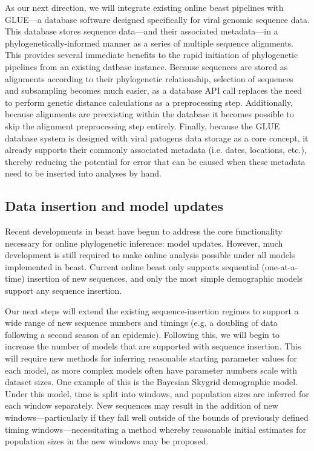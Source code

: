 As our next direction, we will integrate existing online \gls{beast} pipelines with GLUE\cite{singer2018glue}---a database software designed specifically for viral genomic sequence data.
This database stores sequence data---and their associated metadata---in a phylogenetically-informed manner as a series of multiple sequence alignments.
This provides several immediate benefits to the rapid initiation of phylogenetic pipelines from an existing datbase instance.
Because sequences are stored as alignments according to their phylogenetic relationship, selection of sequences and subsampling becomes much easier, as a database API call replaces the need to perform genetic distance calculations as a preprocessing step.
Additionally, because alignments are preexisting within the database it becomes possible to skip the alignment preprocessing step entirely.
Finally, because the GLUE database system is designed with viral patogens data storage as a core concept, it already supports their commonly associated metadata (i.e. dates, locations, etc.), thereby reducing the potential for error that can be caused when these metadata need to be inserted into analyses by hand.

\subsection{Data insertion and model updates}

Recent developments in \gls{beast} have begun to address the core functionality necessary for online phylogenetic inference: model updates\cite{gill2020online}.
However, much development is still required to make online analysis possible under all models implemented in \gls{beast}.
Current online \gls{beast} only supports sequential (one-at-a-time) insertion of new sequences, and only the most simple demographic models support any sequence insertion.

Our next steps will extend the existing sequence-insertion regimes to support a wide range of new sequence numbers and timings (e.g. a doubling of data following a second season of an epidemic).
Following this, we will begin to increase the number of models that are supported with sequence insertion.
This will require new methods for inferring reasonable starting parameter values for each model, as more complex models often have parameter numbers scale with dataset sizes.
One example of this is the Bayesian Skygrid demographic model.
Under this model, time is split into windows, and population sizes are inferred for each window separately.
New sequences may result in the addition of new windows---particularly if they fall well outside of the bounds of previously defined timing windows---necessitating a method whereby reasonable initial estimates for population sizes in the new windows may be proposed.

